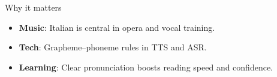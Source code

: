 \redheader
\begin{frame}{Why it matters}
\begin{itemize}
  \item \textbf{Music}: Italian is central in opera and vocal training.
  \item \textbf{Tech}: Grapheme–phoneme rules in TTS and ASR.
  \item \textbf{Learning}: Clear pronunciation boosts reading speed and confidence.
\end{itemize}

\medskip
{}
\end{frame}
